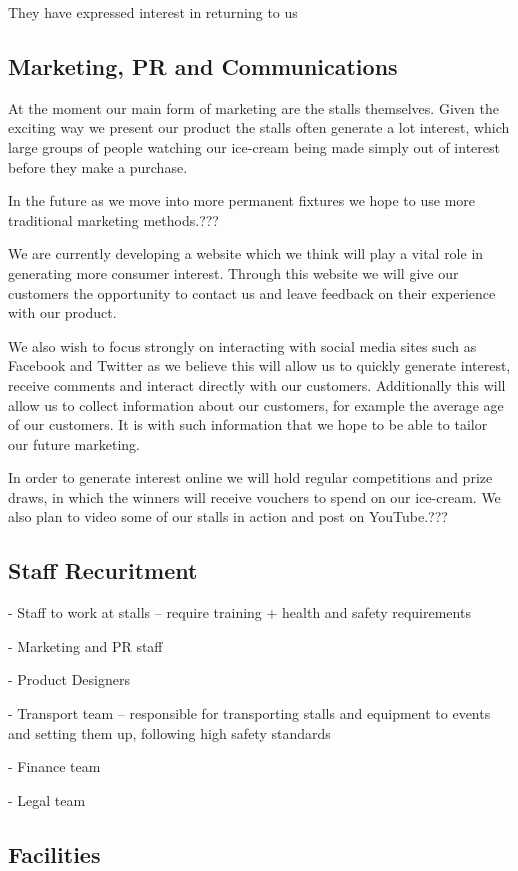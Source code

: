 \documentclass{article}
\begin{document}
  They have expressed interest in returning to us

  \subsection{Marketing, PR and Communications}
  At the moment our main form of marketing are the stalls themselves.
Given the exciting way we present our product the stalls often generate
a lot interest, which large groups of people watching our ice-cream
being made simply out of interest before they make a purchase.

In the future as we move into more permanent fixtures we hope to use
more traditional marketing methods.???

We are currently developing a website which we think will play a vital
role in generating more consumer interest. Through this website we will
give our customers the opportunity to contact us and leave feedback on
their experience with our product.

We also wish to focus strongly on interacting with social media sites
such as Facebook and Twitter as we believe this will allow us to quickly
generate interest, receive comments and interact directly with our
customers. Additionally this will allow us to collect information about
our customers, for example the average age of our customers. It is with
such information that we hope to be able to tailor our future marketing.

In order to generate interest online we will hold regular competitions
and prize draws, in which the winners will receive vouchers to spend on
our ice-cream. We also plan to video some of our stalls in action and
post on YouTube.???

  \subsection{Staff Recuritment}


 - Staff to work at stalls – require training + health and safety
requirements

 - Marketing and PR staff

 - Product Designers

 - Transport team – responsible for transporting stalls and equipment to events and setting them up, following high safety standards

 - Finance team

 - Legal team

  \subsection{Facilities}
\end{document}

